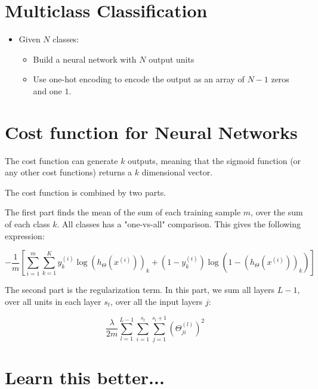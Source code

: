 \section{Multiclass Classification}
\begin{itemize}
    \item Given $N$ classes:
    \begin{itemize}
        \item Build a neural network with $N$ output units
        \item Use one-hot encoding to encode the output as an array of $N-1$ zeros and one $1$.
    \end{itemize}
\end{itemize}

\section{Cost function for Neural Networks}
The cost function can generate $k$ outputs, meaning that the sigmoid function (or any other cost functions) returns a $k$ dimensional vector.

The cost function is combined by two parts.

\bigskip

The first part finds the mean of the sum of each training sample $m$, over the sum of each class $k$. All classes has a "one-vs-all" comparison. This gives the following expression:

\[
    -\frac{1}{m}\left[\sum_{i=1}^m\sum_{k=1}^Ky_k^{(i)} \log\left(h_\Theta(x^{(i)})\right)_k+(1-y_k^{(i)}) \log\left(1-(h_\Theta(x^{(i)}))_k\right)\right]
\]

The second part is the regularization term. In this part, we sum all layers $L-1$, over all units in each layer $s_t$, over all the input layers $j$:

\[
    \frac{\lambda}{2m}\sum_{l=1}^{L-1}\sum_{i=1}^{s_t}\sum_{j=1}^{s_l+1}(\Theta_{ji}^{(l)})^2
\]

\section{Learn this better...}



%
